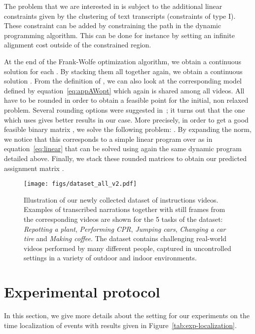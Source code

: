 \documentclass[10pt,twocolumn,letterpaper]{article}
\begin{document}
The problem that we are interested in is subject to the additional linear constraints given by the clustering of text transcripts (constraints of type I).
These constraint can be added by constraining the path in the dynamic programming algorithm.
This can be done for instance by setting an infinite alignment cost outside of the constrained region.

At the end of the Frank-Wolfe optimization algorithm, we obtain a continuous solution  for each .
By stacking them all together again, we obtain a continuous solution . From the definition of , we can also look at the corresponding model  defined by equation~\eqref{eq:appAWopt} which again is shared among all videos.
All  have to be rounded in order to obtain a feasible point for the initial, non relaxed problem.
Several rounding options were suggested in~\cite{Bojanowski15weakly}; it turns out that the one which uses  gives better results in our case.
More precisely, in order to get a good feasible binary matrix , we solve the following problem: .
By expanding the norm, we notice that this corresponds to a simple linear program over  as in equation~\eqref{eq:linear} that can be solved using again the same dynamic program detailed above.
Finally, we stack these rounded matrices  to obtain our predicted assignment matrix .



\begin{figure*}[ht!]
       \centering
\texttt{[image: figs/dataset\_all\_v2.pdf]} \caption{\small Illustration of our newly collected dataset of instructions videos. 
     Examples of transcribed narrations together with still frames from the corresponding videos are shown for the 5 tasks of the dataset: 
{\em Repotting a plant}, {\em Performing CPR}, {\em Jumping cars}, {\em Changing a car tire} and {\em Making coffee}. 
     The dataset contains challenging real-world videos performed by many different people, captured in uncontrolled settings in a variety of outdoor and indoor environments.  
}
     \label{fig:datasetApp}
 \end{figure*}

\section{Experimental protocol}
\label{subsec:details_experiments}

In this section, we give more details about the setting for our experiments on the time localization of events with results given in Figure~\ref{tab:exp-localization}.
\end{document}
